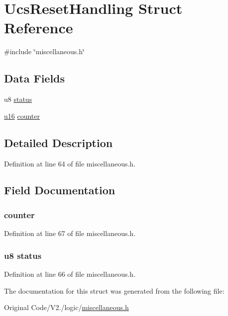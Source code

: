 \hypertarget{structUcsResetHandling}{\section{\-Ucs\-Reset\-Handling \-Struct \-Reference}
\label{structUcsResetHandling}
}


{\ttfamily \#include \char`\"{}miscellaneous.\-h\char`\"{}}

\subsection*{\-Data \-Fields}
\begin{DoxyCompactItemize}
\item 
u8 \hyperlink{structUcsResetHandling_aa648386576736be0dd25c95b6edd37d2}{status}
\item 
\hyperlink{main__ED__BM_8c_a9e6c91d77e24643b888dbd1a1a590054}{u16} \hyperlink{structUcsResetHandling_ad00d8d1e3945b2409706acf4fb49f3c1}{counter}
\end{DoxyCompactItemize}


\subsection{\-Detailed \-Description}


\-Definition at line 64 of file miscellaneous.\-h.



\subsection{\-Field \-Documentation}
\hypertarget{structUcsResetHandling_ad00d8d1e3945b2409706acf4fb49f3c1}{
\subsubsection[{counter}]{ {\bf counter}}}\label{structUcsResetHandling_ad00d8d1e3945b2409706acf4fb49f3c1}


\-Definition at line 67 of file miscellaneous.\-h.

\hypertarget{structUcsResetHandling_aa648386576736be0dd25c95b6edd37d2}{
\subsubsection[{status}]{\setlength{\rightskip}{0pt plus 5cm}u8 {\bf status}}}\label{structUcsResetHandling_aa648386576736be0dd25c95b6edd37d2}


\-Definition at line 66 of file miscellaneous.\-h.



\-The documentation for this struct was generated from the following file\-:\begin{DoxyCompactItemize}
\item 
\-Original Code/\-V2./logic/\hyperlink{miscellaneous_8h}{miscellaneous.\-h}\end{DoxyCompactItemize}
